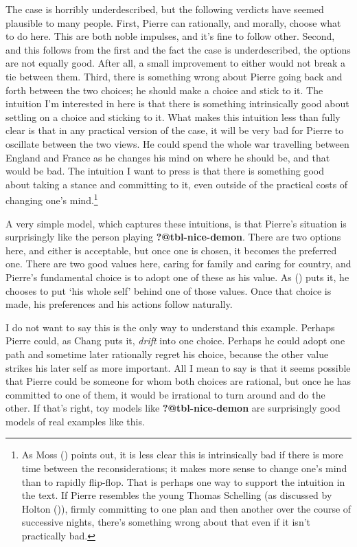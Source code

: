 \documentclass[
  11pt,
  letterpaper,
  DIV=11,
  numbers=noendperiod,
  twoside]{scrartcl}
\begin{document}
The case is horribly underdescribed, but the following verdicts have
seemed plausible to many people. First, Pierre can rationally, and
morally, choose what to do here. This are both noble impulses, and it's
fine to follow other. Second, and this follows from the first and the
fact the case is underdescribed, the options are not equally good. After
all, a small improvement to either would not break a tie between them.
Third, there is something wrong about Pierre going back and forth
between the two choices; he should make a choice and stick to it. The
intuition I'm interested in here is that there is something
intrinsically good about settling on a choice and sticking to it. What
makes this intuition less than fully clear is that in any practical
version of the case, it will be very bad for Pierre to oscillate between
the two views. He could spend the whole war travelling between England
and France as he changes his mind on where he should be, and that would
be bad. The intuition I want to press is that there is something good
about taking a stance and committing to it, even outside of the
practical costs of changing one's mind.\footnote{As Moss
  () points out, it is less clear this is
  intrinsically bad if there is more time between the reconsiderations;
  it makes more sense to change one's mind than to rapidly flip-flop.
  That is perhaps one way to support the intuition in the text. If
  Pierre resembles the young Thomas Schelling (as discussed by Holton
  ()), firmly committing to one plan and
  then another over the course of successive nights, there's something
  wrong about that even if it isn't practically bad.}

A very simple model, which captures these intuitions, is that Pierre's
situation is surprisingly like the person playing
\textbf{?@tbl-nice-demon}. There are two options here, and either is
acceptable, but once one is chosen, it becomes the preferred one. There
are two good values here, caring for family and caring for country, and
Pierre's fundamental choice is to adopt one of these as his value. As
() puts it, he chooses to
put `his whole self' behind one of those values. Once that choice is
made, his preferences and his actions follow naturally.

I do not want to say this is the only way to understand this example.
Perhaps Pierre could, as Chang puts it, \emph{drift} into one choice.
Perhaps he could adopt one path and sometime later rationally regret his
choice, because the other value strikes his later self as more
important. All I mean to say is that it seems possible that Pierre could
be someone for whom both choices are rational, but once he has committed
to one of them, it would be irrational to turn around and do the other.
If that's right, toy models like \textbf{?@tbl-nice-demon} are
surprisingly good models of real examples like this.
\end{document}
